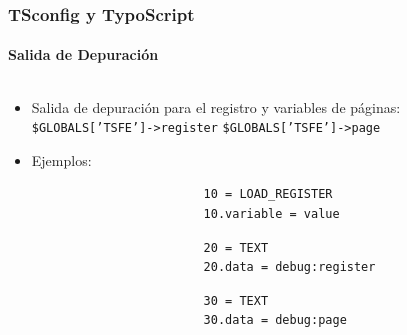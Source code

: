\begin{frame}[fragile]
	\frametitle{TSconfig y TypoScript}
	\framesubtitle{Salida de Depuración}

	\begin{columns}[T]

		\begin{column}{.6\textwidth}
			\begin{itemize}
				\item Salida de depuración para el registro y variables de páginas:\newline
					\texttt{\$GLOBALS['TSFE']->register}\newline
					\texttt{\$GLOBALS['TSFE']->page}

				\item Ejemplos:

					\begin{lstlisting}
						10 = LOAD_REGISTER
						10.variable = value
					\end{lstlisting}

					\begin{lstlisting}
						20 = TEXT
						20.data = debug:register
					\end{lstlisting}

					\begin{lstlisting}
						30 = TEXT
						30.data = debug:page
					\end{lstlisting}

			\end{itemize}
		\end{column}


\end{columns}
\end{frame}
